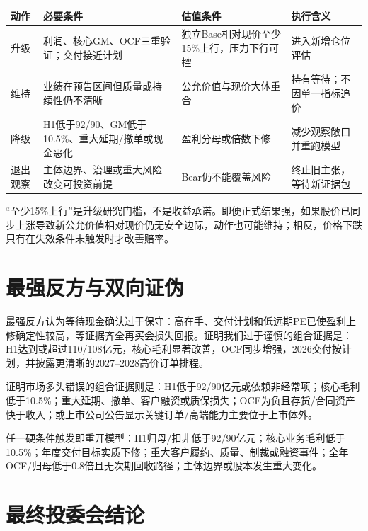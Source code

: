 \begin{exhibitbox}[投委会动作规则]
\small
\begin{tabularx}{\exhibitboxwidth}{L{2.4cm}L{4.5cm}L{4.2cm}X}
\toprule
\textbf{动作} & \textbf{必要条件} & \textbf{估值条件} & \textbf{执行含义} \\
\midrule
升级 & 利润、核心GM、OCF三重验证；交付接近计划 & 独立Base相对现价至少15\%上行，压力下行可控 & 进入新增仓位评估 \\
维持 & 业绩在预告区间但质量或持续性仍不清晰 & 公允价值与现价大体重合 & 持有等待；不因单一指标追价 \\
降级 & H1低于92/90、GM低于10.5\%、重大延期/撤单或现金恶化 & 盈利分母或倍数下修 & 减少观察敞口并重跑模型 \\
退出观察 & 主体边界、治理或重大风险改变可投资前提 & Bear仍不能覆盖风险 & 终止旧主张，等待新证据包 \\
\bottomrule
\end{tabularx}
\end{exhibitbox}

“至少15\%上行”是升级研究门槛，不是收益承诺。即便正式结果强，如果股价已同步上涨导致新公允价值相对现价仍无安全边际，动作也可能维持；相反，价格下跌只有在失效条件未触发时才改善赔率。

\section{最强反方与双向证伪}

最强反方认为等待现金确认过于保守：高在手、交付计划和低远期PE已使盈利上修确定性较高，等证据齐全再买会损失回报。证明我们过于谨慎的组合证据是：H1达到或超过110/108亿元，核心毛利显著改善，OCF同步增强，2026交付按计划，并披露更清晰的2027--2028高价订单排程。

证明市场多头错误的组合证据则是：H1低于92/90亿元或依赖非经常项；核心毛利低于10.5\%；重大延期、撤单、客户融资或质保损失；OCF为负且存货/合同资产快于收入；或上市公司公告显示关键订单/高端能力主要位于上市体外。

\begin{riskbox}[硬失效条件]
任一硬条件触发即重开模型：H1归母/扣非低于92/90亿元；核心业务毛利低于10.5\%；年度交付目标实质下修；重大客户履约、质量、制裁或融资事件；全年OCF/归母低于0.8倍且无次期回收路径；主体边界或股本发生重大变化。
\end{riskbox}

\section{最终投委会结论}

